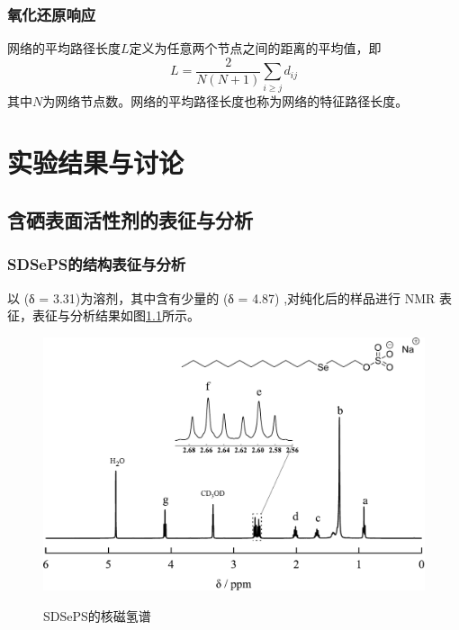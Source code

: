 \documentclass[bachelor,fandolfonts,replaceperiod]{jnuthesis}
\begin{document}
    \subsection{氧化还原响应}
    
    \begin{definition}[平均路径长度]
        网络的平均路径长度$L$定义为任意两个节点之间的距离的平均值，即
        \begin{equation}\label{eq:avarage_path_lentgh}
        L = \frac{2}{N(N+1)}\sum_{i\geq j}d_{ij}
        \end{equation}
        其中$N$为网络节点数。网络的平均路径长度也称为网络的特征路径长度。
    \end{definition}
    
    \chapter{实验结果与讨论}\label{chapter:results}
    \section{含硒表面活性剂的表征与分析}
    \subsection{SDSePS的结构表征与分析}
    以 (δ = 3.31)为溶剂，其中含有少量的 (δ = 4.87)\cite{babij2016nmr} ,对纯化后的样品进行
     NMR 表征，表征与分析结果如图\ref{fig:NMR-12+3}所示。
    \begin{figure}[htbp]
        \centering
        \includegraphics[width=.75\textwidth]{figure/nmr123.pdf}\\
        \caption{SDSePS的核磁氢谱}\label{fig:NMR-12+3}
    \end{figure}
     
\end{document}
